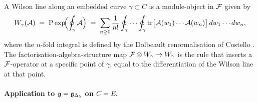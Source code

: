 \begin{proposition}
\label{prop:wilson-line-integral-relation}
A Wilson line along an embedded curve $\gamma\subset C$ is a
module-object in $\mathcal F$ given by
\begin{equation}
\label{eq:wilson-line-as-module}
W_\gamma(\mathcal A)
\;=\;
\mathrm{P}\exp\!\Bigl(\oint_\gamma \mathcal A\Bigr)
\;=\;
\sum_{n\geq 0}\frac{1}{n!}
\oint_\gamma\cdots\oint_\gamma
\mathrm{tr}\bigl[\mathcal A(w_1)\cdots\mathcal A(w_n)\bigr]\,
dw_1\cdots dw_n,
\end{equation}
where the $n$-fold integral is defined by the Dolbeault renormalisation
of Costello \cite[\S11]{Costello2011}. The
factorisation-algebra-structure map
$\mathcal F\otimes W_\gamma\to W_\gamma$ is the rule that inserts a
$\mathcal F$-operator at a specific point of $\gamma$, equal to the
differentiation of the Wilson line at that point.
\end{proposition}

\paragraph{Application to $\mathfrak g = \mathfrak g_{\Delta_5}$ on $C = E$.}

